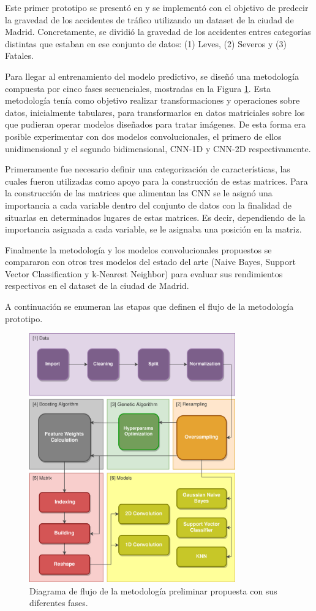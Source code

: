 \documentclass{uathesis-es}
\begin{document}
	Este primer prototipo se presentó en \cite{PEREZSALA2023113245} y se implementó con el objetivo de predecir la gravedad de los accidentes de tráfico utilizando un dataset de la ciudad de Madrid. Concretamente, se dividió la gravedad de los accidentes entres categorías distintas que estaban en ese conjunto de datos: (1) Leves, (2) Severos y (3) Fatales.
	
	Para llegar al entrenamiento del modelo predictivo, se diseñó una metodología compuesta por cinco fases secuenciales, mostradas en la Figura \ref{figDegree}. Esta metodología tenía como objetivo realizar transformaciones y operaciones sobre datos, inicialmente tabulares, para transformarlos en datos matriciales sobre los que pudieran operar modelos diseñados para tratar imágenes. De esta forma era posible experimentar con dos modelos convolucionales, el primero de ellos unidimensional y el segundo bidimensional, CNN-1D y CNN-2D respectivamente.
	
	Primeramente fue necesario definir una categorización de características, las cuales fueron utilizadas como apoyo para la construcción de estas matrices. Para la construcción de las matrices que alimentan las CNN se le asignó una importancia a cada variable dentro del conjunto de datos con la finalidad de situarlas en determinados lugares de estas matrices. Es decir, dependiendo de la importancia asignada a cada variable, se le asignaba una posición en la matriz. 
	
	Finalmente la metodología y los modelos convolucionales propuestos se compararon con otros tres modelos del estado del arte (Naive Bayes, Support Vector Classification y k-Nearest Neighbor) para evaluar sus rendimientos respectivos en el dataset de la ciudad de Madrid.
	
	A continuación se enumeran las etapas que definen el flujo de la metodología prototipo.
	
	\begin{figure}[H]
		\centering
		\includegraphics[width=3.5in]{Figures/1stPaper/Data_flow.png}
		\caption{Diagrama de flujo de la metodología preliminar propuesta con sus diferentes fases.}
		\label{figDegree}
	\end{figure}
	
\end{document}
